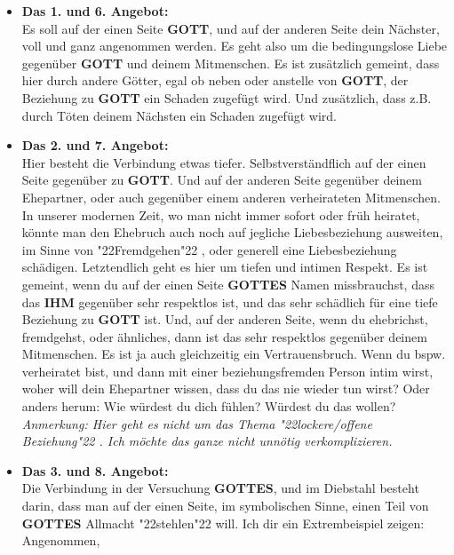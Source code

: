 \documentclass[10pt,a5paper]{article}
\newcommand{\Gottes}[0]{\textbf{GOTTES}}
\newcommand{\Gott}[0]{\textbf{GOTT}}
\newcommand{\Ihm}[0]{\textbf{IHM}}
\newcommand{\q}[1]{\char"22{#1}\char"22 }
\begin{document}
		\begin{itemize}
			\item	\textbf{Das 1. und 6. Angebot:}
			\\		Es soll auf der einen Seite {\Gott},
					und auf der anderen Seite dein N\"achster,
					voll und ganz angenommen werden.
					Es geht also um die bedingungslose Liebe gegen\"uber {\Gott} und deinem Mitmenschen.
					Es ist zus\"atzlich gemeint,
					dass hier durch andere G\"otter,
					egal ob neben oder anstelle von {\Gott},
					der Beziehung zu {\Gott} ein Schaden zugef\"ugt wird.
					Und zus\"atzlich,
					dass z.B. durch T\"oten deinem N\"achsten ein Schaden zugef\"ugt wird.
			\item	\textbf{Das 2. und 7. Angebot:}
			\\		Hier besteht die Verbindung etwas tiefer.
					Selbstverst\"andflich auf der einen Seite gegen\"uber zu {\Gott}.
					Und auf der anderen Seite gegen\"uber deinem Ehepartner,
					oder auch gegen\"uber einem anderen verheirateten Mitmenschen.
					In unserer modernen Zeit,
					wo man nicht immer sofort oder fr\"uh heiratet,
					k\"onnte man den Ehebruch auch noch auf jegliche Liebesbeziehung ausweiten,
					im Sinne von \q{Fremdgehen},
					oder generell eine Liebesbeziehung sch\"adigen.
					Letztendlich geht es hier um tiefen und intimen Respekt.
					Es ist gemeint,
					wenn du auf der einen Seite {\Gottes} Namen missbrauchst,
					dass das {\Ihm} gegen\"uber sehr respektlos ist,
					und das sehr sch\"adlich f\"ur eine tiefe Beziehung zu {\Gott} ist.
					Und,
					auf der anderen Seite,
					wenn du ehebrichst,
					fremdgehst,
					oder \"ahnliches,
					dann ist das sehr respektlos gegen\"uber deinem Mitmenschen.
					Es ist ja auch gleichzeitig ein Vertrauensbruch.
					Wenn du bspw. verheiratet bist,
					und dann mit einer beziehungsfremden Person intim wirst,
					woher will dein Ehepartner wissen,
					dass du das nie wieder tun wirst?
					Oder anders herum:
					Wie w\"urdest du dich f\"uhlen?
					W\"urdest du das wollen?
					\textit{Anmerkung:
					Hier geht es nicht um das Thema \q{lockere/offene Beziehung}.
					Ich m\"ochte das ganze nicht unn\"otig verkomplizieren.}
			\item	\textbf{Das 3. und 8. Angebot:}
			\\		Die Verbindung in der Versuchung {\Gottes},
					und im Diebstahl besteht darin,
					dass man auf der einen Seite,
					im symbolischen Sinne,
					einen Teil von {\Gottes} Allmacht \q{stehlen} will.
					Ich dir ein Extrembeispiel zeigen:
					Angenommen,

\end{itemize}
\end{document}
